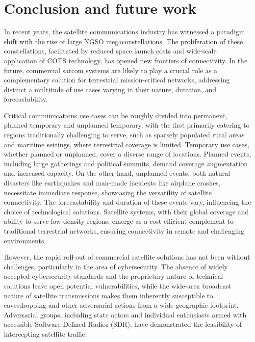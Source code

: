 \documentclass[english, 12pt, a4paper, elec, utf8, a-1b, online]{aaltothesis}
\begin{document}
\clearpage

\section{Conclusion and future work}

In recent years, the satellite communications industry has witnessed a paradigm shift with the rise of large NGSO megaconstellations.
The proliferation of these constellations, facilitated by reduced space launch costs and wide-scale application of COTS technology, has opened new frontiers of connectivity.
In the future, commercial satcom systems are likely to play a crucial role as a complementary solution for terrestrial mission-critical networks, addressing distinct a multitude of use cases varying in their nature, duration, and forecastability.

Critical communications use cases can be roughly divided into permanent, planned temporary and unplanned temporary, with the first primarily catering to regions traditionally challenging to serve, such as sparsely populated rural areas and maritime settings, where terrestrial coverage is limited. Temporary use cases, whether planned or unplanned, cover a diverse range of locations. Planned events, including large gatherings and political summits, demand coverage augmentation and increased capacity. On the other hand, unplanned events, both natural disasters like earthquakes and man-made incidents like airplane crashes, necessitate immediate response, showcasing the versatility of satellite connectivity. The forecastability and duration of these events vary, influencing the choice of technological solutions. Satellite systems, with their global coverage and ability to serve low-density regions, emerge as a cost-efficient complement to traditional terrestrial networks, ensuring connectivity in remote and challenging environments.

However, the rapid roll-out of commercial satellite solutions has not been without challenges, particularly in the area of cybersecurity.
The absence of widely accepted cybersecurity standards and the proprietary nature of technical solutions leave open potential vulnerabilities, while the wide-area broadcast nature of satellite transmissions makes them inherently susceptible to eavesdropping and other adversarial actions from a wide geographic footprint.
Adversarial groups, including state actors and individual enthusiasts armed with accessible Software-Defined Radios (SDR), have demonstrated the feasibility of intercepting satellite traffic.
\end{document}

